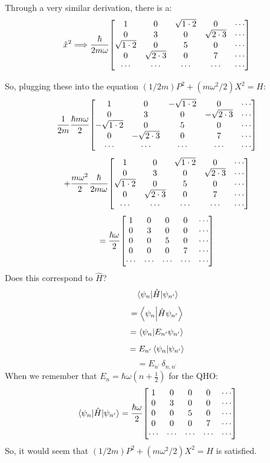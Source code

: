 \documentclass[12pt]{article}
\begin{document}
\begin{itemize}
Through a very similar derivation, there is a: 
\[\hat{x}^2 \Longrightarrow \frac{\hbar}{2m \omega} \mqty[
1 & 0 & \sqrt{1 \cdot 2} & 0 & \cdots \\ 
0 & 3 & 0 & \sqrt{2 \cdot 3} & \cdots \\ 
\sqrt{1 \cdot 2} & 0 & 5 & 0 & \cdots \\ 
0 & \sqrt{2 \cdot 3} & 0 & 7 & \cdots \\ 
\cdots & \cdots & \cdots & \cdots & \cdots]\]

So, plugging these into the equation $(1/2m)P^2 + (m\omega^2 /2)X^2 = H$:
\[\frac{1}{2m}\frac{\hbar m \omega}{2} \mqty[
1 & 0 & -\sqrt{1 \cdot 2} & 0 & \cdots \\ 
0 & 3 & 0 & -\sqrt{2 \cdot 3} & \cdots \\ 
-\sqrt{1 \cdot 2} & 0 & 5 & 0 & \cdots \\ 
0 & -\sqrt{2 \cdot 3} & 0 & 7 & \cdots \\ 
\cdots & \cdots & \cdots & \cdots & \cdots] \]
\[+ \frac{m \omega^2}{2}
\frac{\hbar}{2m \omega} \mqty[
1 & 0 & \sqrt{1 \cdot 2} & 0 & \cdots \\ 
0 & 3 & 0 & \sqrt{2 \cdot 3} & \cdots \\ 
\sqrt{1 \cdot 2} & 0 & 5 & 0 & \cdots \\ 
0 & \sqrt{2 \cdot 3} & 0 & 7 & \cdots \\ 
\cdots & \cdots & \cdots & \cdots & \cdots]\]
\[= \frac{\hbar \omega}{2} \mqty[
1 & 0 & 0 & 0 & \cdots \\ 
0 & 3 & 0 & 0 & \cdots \\ 
0 & 0 & 5 & 0 & \cdots \\ 
0 & 0 & 0 & 7 & \cdots \\ 
\cdots & \cdots & \cdots & \cdots & \cdots]\]
Does this correspond to $\hat{H}$?
\[\mel{\psi_n}{\hat{H}}{\psi_{n^\prime}}\]
\[= \braket{\psi_n}{\hat{H}\psi_{n^\prime}}\]
\[= \braket{\psi_n}{E_{n^\prime}\psi_{n^\prime}}\]
\[= E_{n^\prime}\braket{\psi_n}{\psi_{n^\prime}}\]
\[= E_{n^\prime}\, \delta_{n, n^\prime}\]
When we remember that $E_n = \hbar \omega (n + \frac{1}{2})$ for the QHO: 
\[\mel{\psi_n}{\hat{H}}{\psi_{n^\prime}} = \frac{\hbar \omega}{2} \mqty[
1 & 0 & 0 & 0 & \cdots \\ 
0 & 3 & 0 & 0 & \cdots \\ 
0 & 0 & 5 & 0 & \cdots \\ 
0 & 0 & 0 & 7 & \cdots \\ 
\cdots & \cdots & \cdots & \cdots & \cdots] \]
So, it would seem that $(1/2m)P^2 + (m\omega^2 /2)X^2 = H$ is satisfied.
\end{itemize}
\end{document}
